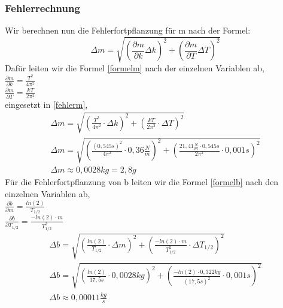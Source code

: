 \documentclass{article}
\begin{document}
          \subsubsection{Fehlerrechnung}
              Wir berechnen nun die Fehlerfortpflanzung für m nach der Formel:\\
              \begin{equation}\label{fehlerm}
                  \Delta m = \sqrt{\left(\frac{\partial m}{\partial k}\Delta k\right)^2 + \left(\frac{\partial m}{\partial T}\Delta T\right)^2}
              \end{equation}
              Dafür leiten wir die Formel \ref{formelm} nach der einzelnen Variablen ab,\\
              $\frac{\partial m}{\partial k}= \frac{T^2}{4\pi^2}$\\
              $\frac{\partial m}{\partial T}= \frac{kT}{2\pi^2}$\\
              eingesetzt in \ref{fehlerm},
              \begin{equation}
                  \begin{gathered}
                      \Delta m = \sqrt{\left(\frac{T^2}{4\pi^2}\cdot \Delta k\right)^2 + \left(\frac{kT}{2\pi^2}\cdot \Delta T\right)^2}\\
                      \Delta m = \sqrt{\left(\frac{(0,545s)^2}{4\pi^2} \cdot 0,36\frac{N}{m} \right)^2 + \left(\frac{21,41\frac{N}{m}\cdot 0,545s}{2\pi^2} \cdot 0,001s\right)^2}\\
                      \Delta m \approx 0,0028kg=2,8g
                  \end{gathered}
              \end{equation}
              Für die Fehlerfortpflanzung von b leiten wir die Formel  \ref{formelb} nach den einzelnen Variablen ab,\\
              $\frac{\partial b}{\partial m}= \frac{ln(2)}{T_{1/2}}$\\
              $\frac{\partial b}{\partial T_{1/2}}= \frac{-ln(2)\cdot m}{T_{1/2}^2}$\\
              \begin{equation}
                  \begin{gathered}
                      \Delta b = \sqrt{\left(\frac{ln(2)}{T_{1/2}}\cdot \Delta m\right)^2 + \left(\frac{-ln(2)\cdot m}{T_{1/2}^2}\cdot \Delta T_{1/2} \right)^2}\\
                      \Delta b = \sqrt{\left(\frac{ln(2)}{17,5s} \cdot 0,0028kg \right)^2 + \left(\frac{-ln(2)\cdot 0,322kg} {(17,5s)^2}\cdot 0,001s\right)^2}\\
                      \Delta b \approx 0,00011\frac{kg}{s}
                  \end{gathered}
              \end{equation}
\end{document}
